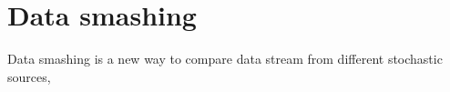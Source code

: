 \section{Data smashing}
	Data smashing\cite{data_smashing} is a new way to compare data stream from different stochastic sources, 